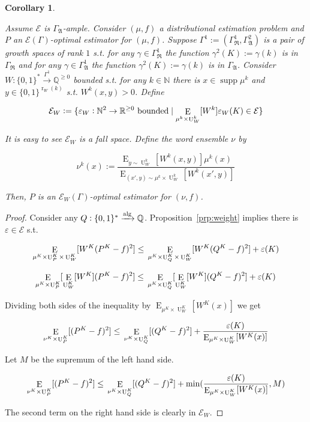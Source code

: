 \documentclass{article}
\numberwithin{equation}{section}
\theoremstyle{definition}
\theoremstyle{plain}
\newtheorem{corollary}{Corollary}[section]
\newcommand{\Bool}{\{0,1\}}
\newcommand{\Words}{{\Bool^*}}
\newcommand{\WordsLen}[1]{{\Bool^{#1}}}
\DeclareMathOperator{\Supp}{supp}
\DeclareMathOperator{\E}{E}
\DeclareMathOperator{\R}{r}
\DeclareMathOperator{\Un}{U}
\newcommand{\Nats}{\mathbb{N}}
\newcommand{\Rats}{\mathbb{Q}}
\newcommand{\Reals}{\mathbb{R}}
\newcommand{\GrowR}{\Gamma_{\mathfrak{R}}}
\newcommand{\GrowA}{\Gamma_{\mathfrak{A}}}
\newcommand{\Fall}{\mathcal{E}}
\newcommand{\EG}{\Fall(\Gamma)}
\newcommand{\Alg}{\xrightarrow{\textnormal{alg}}}
\begin{document}
\begin{samepage}
\begin{corollary}
\label{crl:weight}

Assume $\Fall$ is $\GrowA$-ample. Consider $(\mu,f)$ a distributional estimation problem and $P$ an $\EG$-optimal estimator for $(\mu,f)$. Suppose ${\Gamma^1:=(\GrowR^1,\GrowA^2)}$ is a pair of growth spaces of rank $1$ s.t. for any $\gamma \in \GrowR^1$ the function ${\gamma^2(K):=\gamma(k)}$ is in $\GrowR$ and for any $\gamma \in \GrowA^1$ the function $\gamma^2(K):=\gamma(k)$ is in $\GrowA$. Consider ${W: \Words \xrightarrow{\Gamma^1} \Rats^{\geq 0}}$ bounded s.t. for any $k \in \Nats$ there is $x \in \Supp \mu^k$ and $y \in \WordsLen{\R_W(k)}$ s.t. $W^k(x,y) > 0$. Define 

$${\Fall_W:=\{\varepsilon_W: \Nats^2 \rightarrow \Reals^{\geq 0} \textnormal{ bounded} \mid  \E_{\mu^k \times \Un_W^k}[W^k]\varepsilon_W(K) \in \Fall\}}$$

It is easy to see $\Fall_W$ is a fall space. Define the word ensemble $\nu$ by 

\[\nu^k(x):=\frac{\E_{y \sim \Un_W^k}[W^k(x,y)] \mu^k(x)}{\E_{(x',y) \sim \mu^k \times \Un_W^k}[W^k(x',y)]}\]

Then, $P$ is an $\Fall_W(\Gamma)$-optimal estimator for $(\nu,f)$.

\end{corollary}
\end{samepage}

\begin{proof}

Consider any $Q: \Words \Alg \Rats$. Proposition~\ref{prp:weight} implies there is $\varepsilon \in \Fall$ s.t.

$$\E_{\mu^{K} \times \Un_P^{K} \times \Un_W^{K}}[W^{K}(P^{K} - f)^2] \leq \\ \E_{\mu^{K} \times \Un_Q^{K} \times \Un_W^{K}}[W^{K}(Q^{K} - f)^2] + \varepsilon(K)$$

$$\E_{\mu^{K} \times \Un_P^{K}}[\E_{\Un_W^{K}}[W^{K}](P^{K} - f)^2] \leq \\ \E_{\mu^{K} \times \Un_Q^{K}}[\E_{\Un_W^{K}}[W^{K}](Q^{K} - f)^2] + \varepsilon(K)$$

Dividing both sides of the inequality by $\E_{\mu^{K} \times \Un_W^{K}}[W^{K}(x)]$ we get

$$\E_{\nu^{K} \times \Un_P^{K}}[(P^{K} - f)^2] \leq \\ \E_{\nu^{K} \times \Un_Q^{K}}[(Q^{K} - f)^2] + \frac{\varepsilon(K)}{\E_{\mu^{K} \times \Un_W^{K}}[W^{K}(x)]}$$

Let $M$ be the supremum of the left hand side.

$$\E_{\nu^{K} \times \Un_P^{K}}[(P^{K} - f)^2] \leq \\ \E_{\nu^{K} \times \Un_Q^{K}}[(Q^{K} - f)^2] + \min(\frac{\varepsilon(K)}{\E_{\mu^{K} \times \Un_W^{K}}[W^{K}(x)]},M)$$

The second term on the right hand side is clearly in $\Fall_W$.
\end{proof}
\end{document}
